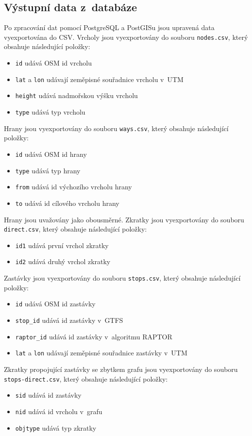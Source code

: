\subsection{Výstupní data z~databáze}
Po zpracování dat pomocí PostgreSQL a PostGISu jsou upravená data vyexportována
do CSV. Vrcholy jsou vyexportovány do souboru {\tt nodes.csv}, který obsahuje
následující položky:
\begin{itemize}
	\item {\tt id} udává OSM id vrcholu
	\item {\tt lat} a {\tt lon} udávají zeměpisné souřadnice vrcholu v~UTM
	\item {\tt height} udává nadmořskou výšku vrcholu
	\item {\tt type} udává typ vrcholu
\end{itemize} 
Hrany jsou vyexportovány do souboru {\tt ways.csv}, který obsahuje následující
položky:
\begin{itemize}
	\item {\tt id} udává OSM id hrany
	\item {\tt type} udává typ hrany
	\item {\tt from} udává id výchozího vrcholu hrany
	\item {\tt to} udává id cílového vrcholu hrany
\end{itemize} 
Hrany jsou uvažovány jako obousměrné.
Zkratky jsou vyexportovány do souboru {\tt direct.csv}, který obsahuje
následující položky:
\begin{itemize}
	\item {\tt id1} udává první vrchol zkratky
	\item {\tt id2} udává druhý vrchol zkratky
\end{itemize} 
Zastávky jsou vyexportovány do souboru {\tt stops.csv}, který obsahuje
následující položky:
\begin{itemize}
	\item {\tt id} udává OSM id zastávky
	\item {\tt stop\_id} udává id zastávky v~GTFS
	\item {\tt raptor\_id} udává id zastávky v~algoritmu RAPTOR
	\item {\tt lat} a {\tt lon} udávají zeměpisné souřadnice zastávky v~UTM
\end{itemize} 
Zkratky propojující zastávky se zbytkem grafu jsou vyexportovány do souboru {\tt
stops-direct.csv}, který obsahuje následující položky:
\begin{itemize}
	\item {\tt sid} udává id zastávky
	\item {\tt nid} udává id vrcholu v~grafu
	\item {\tt objtype} udává typ zkratky
\end{itemize} 
